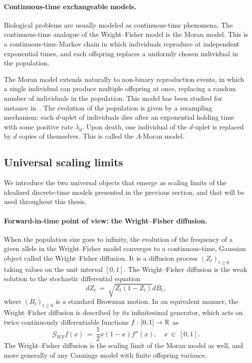 \paragraph{Continuous-time exchangeable models.} 
Biological problems are usually modeled as continuous-time phenomena. 
The continuous-time analogue of the Wright--Fisher model is the Moran model. This is a continuous-time Markov chain in which individuals reproduce at independent exponential times, and each offspring replaces a uniformly chosen individual in the population. 

The Moran model extends naturally to non-binary reproduction events, in which a single individual can produce multiple offspring at once, replacing a random number of individuals in the population.  This model has been studied for instance in~\citet{etheridge_coalescent_2010,birkner_measure-valued_2009}. The evolution of the population is given by a resampling mechanism: each $d$-uplet of individuals dies after an exponential holding time with some positive rate $\lambda_d$. Upon death, one individual of the $d$-uplet is replaced by $d$ copies of themselves. This is called the $\Lambda$-Moran model.


\subsection{Universal scaling limits}
We introduce the two universal objects that emerge as scaling limits of the idealized discrete-time models presented in the previous section, and that will be used throughout this thesis.
\paragraph{Forward-in-time point of view: the Wright--Fisher diffusion.}
When the population size goes to infinity, the evolution of the frequency of a given allele in the Wright--Fisher model converges to a continuous-time, Gaussian object called the Wright--Fisher diffusion. It is a diffusion process $(Z_t)_{t\geq 0}$ taking values on the unit interval $[0,1]$. The Wright--Fisher diffusion is the weak solution to the stochastic differential equation
\[
dZ_t\ =\ \sqrt{Z_t(1-Z_t)} dB_t,
\]
where $(B_t)_{t\geq 0}$ is a standard Brownian motion. In an equivalent manner, the Wright--Fisher diffusion is described by its infinitesimal generator, which acts on twice continuously differentiable functions $f:[0,1]\to \operatorname{\mathbb{R}}$ as
\[
\mathcal{G}_{WF} f(x)\ =\ \frac{1}{2} x(1-x) f''(x),\quad x\ \in\ [0,1].
\]
The Wright--Fisher diffusion is the scaling limit of the Moran model as well, and more generally of any Cannings model with finite offspring variance.

